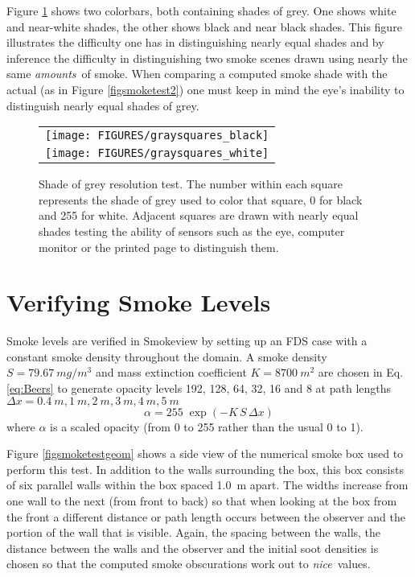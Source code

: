 \documentclass[11pt,twoside]{book}
\begin{document}
Figure \ref{figgraysquare} shows two colorbars, both containing shades of grey.
One shows white and near-white shades, the other shows black and near black shades.
This figure illustrates the difficulty one has in distinguishing nearly equal shades
and by inference the difficulty in distinguishing two smoke scenes drawn using nearly
the same {\em amounts}\ of smoke.  When comparing a computed smoke shade with the actual
(as in Figure \ref{figsmoketest2}) one must keep in mind the eye's inability to
distinguish nearly equal shades of grey.

\begin{figure}[\figoptions]
\begin{center}
 \centering
\begin{tabular}{c}
\texttt{[image: FIGURES/graysquares\_black]}\\
\texttt{[image: FIGURES/graysquares\_white]}\\
 \end{tabular}
\end{center}
 \caption[Shade of grey resolution test.]{Shade of grey resolution test.
 The number within each square represents the shade of grey used to color
 that square,  0 for black and 255 for white.  Adjacent squares are drawn
 with nearly equal shades  testing the ability of sensors such as the eye,
 computer monitor or the printed page  to distinguish them.
 }
\label{figgraysquare}%
\end{figure}

\section{Verifying Smoke Levels}
\label{sect:verify_smoke}

Smoke levels are verified in Smokeview by setting up an FDS case with a
constant smoke density throughout the domain.  A smoke density $S=\SI{79.67}{mg/m^3}$ and
mass extinction coefficient $K=\SI{8700}{m^2}$ are chosen in Eq. \ref{eq:Beers}
to generate opacity levels 192, 128, 64, 32, 16 and 8 at path lengths
$\Delta x = \SI{0.4}{m}, \SI{1}{m}, \SI{2}{m}, \SI{3}{m}, \SI{4}{m} , \SI{5}{m}$
\begin{equation}
\alpha = 255 \; \exp(-K \, S \, \Delta x)
\label{eq:Beers}
\end{equation}
where $\alpha$ is a scaled opacity (from 0 to 255 rather than the usual 0 to 1).

Figure \ref{figsmoketestgeom} shows a side view of the numerical smoke box used to
perform this test.  In addition to the walls surrounding the box, this box consists
of  six parallel walls within the box spaced 1.0~m apart.  The widths increase from
one wall to the next (from front to back) so that when looking at the box from the
front a different distance or path length occurs between the observer and the portion
of the wall that is visible. Again, the spacing between the walls, the distance between
the walls and the observer and the initial soot densities is chosen so that the computed
smoke obscurations work out to {\em nice}\ values.
\end{document}
